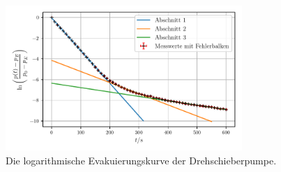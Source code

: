     \begin{figure}
        \centering
        \includegraphics[width=0.8\textwidth]{abb/dreh_evac.pdf}
        \caption{Die logarithmische Evakuierungskurve der Drehschieberpumpe.}
        \label{fig:drehEvac}
    \end{figure}

